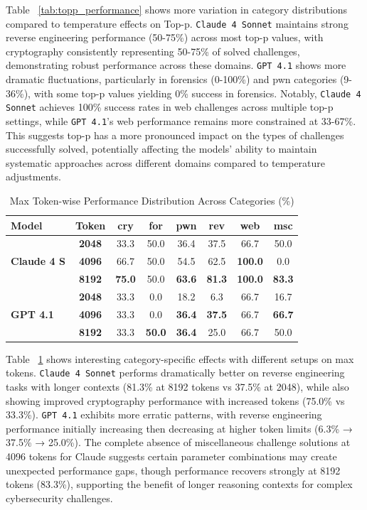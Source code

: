 Table ~\ref{tab:topp_performance} shows more variation in category distributions compared to temperature effects on Top-p. \texttt{Claude 4 Sonnet} maintains strong reverse engineering performance (50-75\%) across most top-p values, with cryptography consistently representing 50-75\% of solved challenges, demonstrating robust performance across these domains. \texttt{GPT 4.1} shows more dramatic fluctuations, particularly in forensics (0-100\%) and pwn categories (9-36\%), with some top-p values yielding 0\% success in forensics. Notably, \texttt{Claude 4 Sonnet} achieves 100\% success rates in web challenges across multiple top-p settings, while \texttt{GPT 4.1}'s web performance remains more constrained at 33-67\%. This suggests top-p has a more pronounced impact on the types of challenges successfully solved, potentially affecting the models' ability to maintain systematic approaches across different domains compared to temperature adjustments.

\begin{table}[htbp]
\centering
\small
\caption{Max Token-wise Performance Distribution Across Categories (\%)}
\label{tab:maxtoken_performance}
\begin{tabular}{l|c|*{6}{c}}
\toprule
\textbf{Model} & \textbf{Token} & \textbf{cry} & \textbf{for} & \textbf{pwn} & \textbf{rev} & \textbf{web} & \textbf{msc} \\
\midrule
\multirow{3}{*}{\textbf{Claude 4 S}} 
& \textbf{2048} & 33.3 & 50.0 & 36.4 & 37.5 & 66.7 & 50.0 \\
& \textbf{4096} & 66.7 & 50.0 & 54.5 & 62.5 & \textbf{100.0} & 0.0 \\
& \textbf{8192} & \textbf{75.0} & 50.0 & \textbf{63.6} & \textbf{81.3} & \textbf{100.0} & \textbf{83.3} \\
\midrule
\multirow{3}{*}{\textbf{GPT 4.1}} 
& \textbf{2048} & 33.3 & 0.0 & 18.2 & 6.3 & 66.7 & 16.7 \\
& \textbf{4096} & 33.3 & 0.0 & \textbf{36.4} & \textbf{37.5} & 66.7 & \textbf{66.7} \\
& \textbf{8192} & 33.3 & \textbf{50.0} & \textbf{36.4} & 25.0 & 66.7 & 50.0 \\
\bottomrule
\end{tabular}
\end{table}

Table ~\ref{tab:maxtoken_performance} shows interesting category-specific effects with different setups on max tokens. \texttt{Claude 4 Sonnet} performs dramatically better on reverse engineering tasks with longer contexts (81.3\% at 8192 tokens vs 37.5\% at 2048), while also showing improved cryptography performance with increased tokens (75.0\% vs 33.3\%). \texttt{GPT 4.1} exhibits more erratic patterns, with reverse engineering performance initially increasing then decreasing at higher token limits (6.3\% → 37.5\% → 25.0\%). The complete absence of miscellaneous challenge solutions at 4096 tokens for Claude suggests certain parameter combinations may create unexpected performance gaps, though performance recovers strongly at 8192 tokens (83.3\%), supporting the benefit of longer reasoning contexts for complex cybersecurity challenges.
